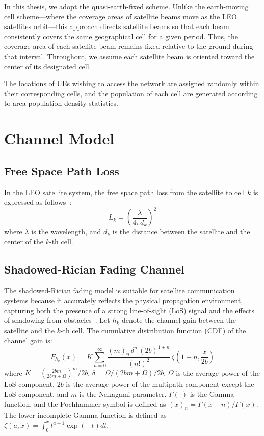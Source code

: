 In this thesis, we adopt the quasi-earth-fixed scheme. Unlike the earth-moving cell scheme—where the coverage areas of satellite beams move as the LEO satellites orbit—this approach directs satellite beams so that each beam consistently covers the same geographical cell for a given period. Thus, the coverage area of each satellite beam remains fixed relative to the ground during that interval. Throughout, we assume each satellite beam is oriented toward the center of its designated cell.

The locations of UEs wishing to access the network are assigned randomly within their corresponding cells, and the population of each cell are generated according to area population density statistics.

\section{Channel Model}

\subsection{Free Space Path Loss}
In the LEO satellite system, the free space path loss from the satellite to cell $k$ is expressed as follows~\cite{Satellite-Multi-Beam}:
\begin{equation}
    L_{k} = \left(\frac{\lambda}{4\pi d_{k}}\right)^2
\end{equation}
where $\lambda$ is the wavelength, and $d_{k}$ is the distance between the satellite and the center of the $k$-th cell.

\subsection{Shadowed-Rician Fading Channel}
The shadowed-Rician fading model is suitable for satellite communication systems because it accurately reflects the physical propagation environment, capturing both the presence of a strong line-of-sight (LoS) signal and the effects of shadowing from obstacles~\cite{channel-model}. Let $h_{k}$ denote the channel gain between the satellite and the $k$-th cell. The cumulative distribution function (CDF) of the channel gain is:
\begin{equation}
    F_{h_{k}}(x) = K \sum_{n=0}^{\infty} \frac{(m)_n \, \delta^n \, (2b)^{1+n}}{(n!)^2} \, \zeta\left(1+n, \frac{x}{2b}\right)
\end{equation}
where $K = \left(\frac{2bm}{2bm+\Omega}\right)^m/2b$, $\delta = \Omega/(2bm+\Omega)/2b$, $\Omega$ is the average power of the LoS component, $2b$ is the average power of the multipath component except the LoS component, and $m$ is the Nakagami parameter.  $\Gamma(\cdot)$ is the Gamma function, and the Pochhammer symbol is defined as $(x)_n=\Gamma(x+n)/\Gamma(x)$. The lower incomplete Gamma function is defined as $\zeta(a, x) = \int_0^x t^{a-1} \exp(-t)dt$.

